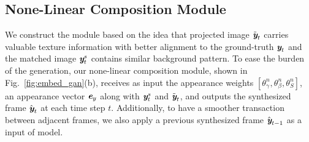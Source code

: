 \documentclass[runningheads]{llncs}
\def\mathbi#1{\textbf{\em #1}}
\begin{document}


\subsection{None-Linear Composition Module} 
\label{subsec:none-linear}
We construct the module based on the idea that projected image $\tilde{\mathbi{y}}_t$ carries valuable texture information with better alignment to the ground-truth $ \mathbi{y}_t$ and the matched image $\mathbi{y}_t^s$ contains similar background pattern. To ease the burden of the generation, our none-linear composition module, shown in Fig.~\ref{fig:embed_gan}(b), receives as input the appearance weights $[{\theta}^n_{\gamma}, {\theta}^n_{\beta}, {\theta}^n_{S}]$, an appearance vector $\mathbi{e}_y$ along with $\mathbi{y}_t^s$ and $\tilde{\mathbi{y}}_t$, and outputs the synthesized frame $\hat{\mathbi{y}}_{t}$ at each time step $t$. Additionally, to have a smoother transaction between adjacent frames, we also apply a previous synthesized frame $\hat{\mathbi{y}}_{t-1}$ as a input of model.
\end{document}
